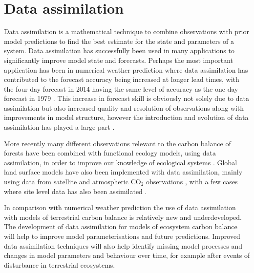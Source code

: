 \documentclass[11pt]{article}
\begin{document}


\section{Data assimilation}

Data assimilation is a mathematical technique to combine observations with prior model predictions to find the best estimate for the state and parameters of a system. Data assimilation has successfully been used in many applications to significantly improve model state and forecasts. Perhaps the most important application has been in numerical weather prediction where data assimilation has contributed to the forecast accuracy being increased at longer lead times, with the four day forecast in 2014 having the same level of accuracy as the one day forecast in 1979 \citep{bauer2015quiet}. This increase in forecast skill is obviously not solely due to data assimilation but also increased quality and resolution of observations along with improvements in model structure, however the introduction and evolution of data assimilation has played a large part \citep{dee2011era}.

More recently many different observations relevant to the carbon balance of forests have been combined with functional ecology models, using data assimilation, in order to improve our knowledge of ecological systems \citep{zobitz2011primer, fox2009reflex, richardson2010estimating, Quaife2008, Zobitz2014, Niu2014}. Global land surface models have also been implemented with data assimilation,  mainly using data from satellite and atmospheric $\text{CO}_{2}$ observations \citep{Kaminski2013, scholze2007propagating}, with a few cases where site level data has also been assimilated \citep{Verbeeck2011, Bacour2015}. 

In comparison with numerical weather prediction the use of data assimilation with models of terrestrial carbon balance is relatively new and underdeveloped. The development of data assimilation for models of ecosystem carbon balance will help to improve model parameterisations and future predictions. Improved data assimilation techniques will also help identify missing model processes and changes in model parameters and behaviour over time, for example after events of disturbance in terrestrial ecosystems.
  


{}
\end{document}
